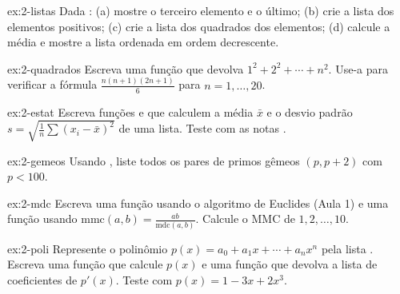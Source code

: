 \begin{exercicio}{ex:2-listas}
Dada :
(a) mostre o terceiro elemento e o último;
(b) crie a lista dos elementos positivos;
(c) crie a lista dos quadrados dos elementos;
(d) calcule a média e mostre a lista ordenada em ordem decrescente.
\end{exercicio}

\begin{exercicio}{ex:2-quadrados}
Escreva uma função  que devolva $1^2+2^2+\cdots+n^2$. Use-a para verificar a fórmula
$\frac{n(n+1)(2n+1)}{6}$ para $n=1,\dots,20$.
\end{exercicio}

\begin{exercicio}{ex:2-estat}
Escreva funções  e  que calculem a média $\bar x$ e o desvio padrão
$\displaystyle s=\sqrt{\tfrac{1}{n}\sum (x_i-\bar x)^2}$ de uma lista. Teste com as notas \py{[9.5, 7.5, 10, 8.0, 6.5]}.
\end{exercicio}

\begin{exercicio}{ex:2-gemeos}
Usando , liste todos os pares de primos gêmeos $(p, p+2)$ com $p<100$.
\end{exercicio}

\begin{exercicio}{ex:2-mdc}
Escreva uma função  usando o algoritmo de Euclides (Aula 1) e uma função  usando
$\mathrm{mmc}(a,b)=\frac{ab}{\mathrm{mdc}(a,b)}$. Calcule o MMC de $1, 2, \dots, 10$.
\end{exercicio}

\begin{exercicio}{ex:2-poli}
Represente o polinômio $p(x)=a_0+a_1x+\cdots+a_nx^n$ pela lista \py{[a0, a1, ..., an]}. Escreva uma função
 que calcule $p(x)$ e uma função  que devolva a lista de coeficientes de
$p'(x)$. Teste com $p(x)=1-3x+2x^3$.
\end{exercicio}
